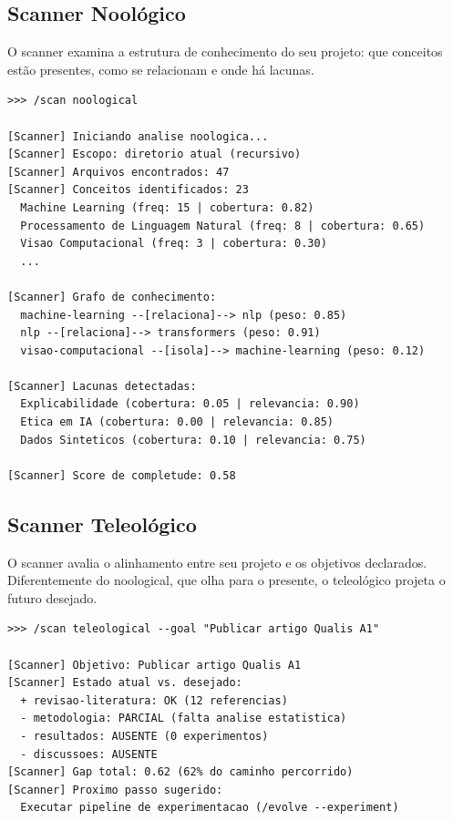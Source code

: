 \subsection{Scanner Noológico}
\label{subsec:scanner-noologico}

O scanner  examina a estrutura de conhecimento do seu
projeto: que conceitos estão presentes, como se relacionam e onde há
lacunas.

\begin{lstlisting}[style=bashstyle, caption={Executando o scanner
noological}, label={lst:scan-noological}]
>>> /scan noological

[Scanner] Iniciando analise noologica...
[Scanner] Escopo: diretorio atual (recursivo)
[Scanner] Arquivos encontrados: 47
[Scanner] Conceitos identificados: 23
  Machine Learning (freq: 15 | cobertura: 0.82)
  Processamento de Linguagem Natural (freq: 8 | cobertura: 0.65)
  Visao Computacional (freq: 3 | cobertura: 0.30)
  ...

[Scanner] Grafo de conhecimento:
  machine-learning --[relaciona]--> nlp (peso: 0.85)
  nlp --[relaciona]--> transformers (peso: 0.91)
  visao-computacional --[isola]--> machine-learning (peso: 0.12)

[Scanner] Lacunas detectadas:
  Explicabilidade (cobertura: 0.05 | relevancia: 0.90)
  Etica em IA (cobertura: 0.00 | relevancia: 0.85)
  Dados Sinteticos (cobertura: 0.10 | relevancia: 0.75)

[Scanner] Score de completude: 0.58
\end{lstlisting}

\subsection{Scanner Teleológico}
\label{subsec:scanner-teleologico}

O scanner  avalia o alinhamento entre seu projeto e
os objetivos declarados. Diferentemente do noological, que olha para o
presente, o teleológico projeta o futuro desejado.

\begin{lstlisting}[style=bashstyle, caption={Executando o scanner
teleological com objetivos personalizados},
label={lst:scan-teleological}]
>>> /scan teleological --goal "Publicar artigo Qualis A1"

[Scanner] Objetivo: Publicar artigo Qualis A1
[Scanner] Estado atual vs. desejado:
  + revisao-literatura: OK (12 referencias)
  - metodologia: PARCIAL (falta analise estatistica)
  - resultados: AUSENTE (0 experimentos)
  - discussoes: AUSENTE
[Scanner] Gap total: 0.62 (62% do caminho percorrido)
[Scanner] Proximo passo sugerido:
  Executar pipeline de experimentacao (/evolve --experiment)
\end{lstlisting}

